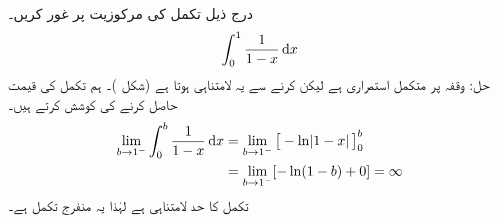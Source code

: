 \\
درج ذیل تکمل کی مرکوزیت پر غور کریں۔
\begin{align*}
\int_0^1\frac{1}{1-x}\dif x
\end{align*}
حل:\quad
وقفہ \عددی{[0,1)} پر متکمل  استمراری ہے  لیکن  کرنے سے یہ لامتناہی ہوتا ہے (شکل )۔ ہم تکمل کی قیمت حاصل کرنے کی کوشش کرتے ہیں۔
\begin{align*}
\lim_{b\to1^-}\int_0^b\frac{1}{1-x}\dif x&=\lim_{b\to 1^-}\big[-\ln\abs{1-x}\big]_0^b\\
&=\lim_{b\to 1^-}[-\ln(1-b)+0]=\infty
\end{align*}
تکمل کا حد لامتناہی ہے لہٰذا یہ منفرج تکمل ہے۔
